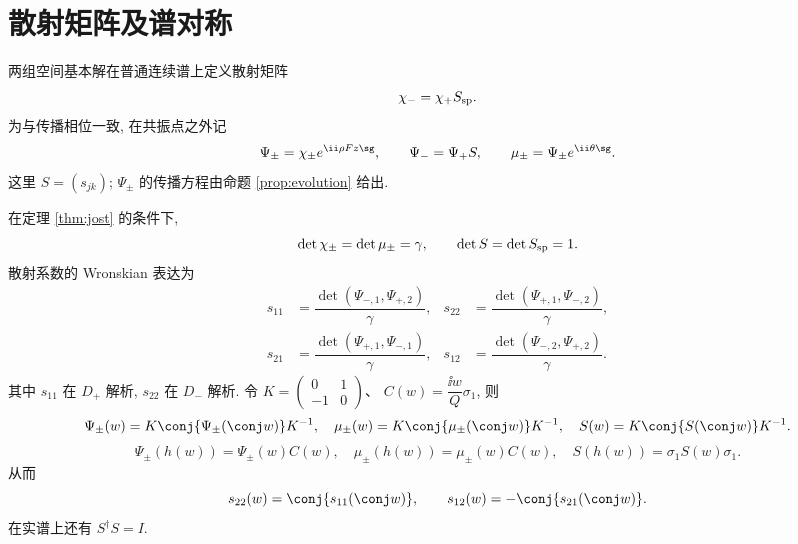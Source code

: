 \section{散射矩阵及谱对称}
两组空间基本解在普通连续谱上定义散射矩阵
\begin{equation}\label{eq:Sdef}
\chi_-=\chi_+S_{\rm sp}.
\end{equation}
为与传播相位一致, 在共振点之外记
\[
\Psi_\pm=\chi_\pm e^{\ii\rho Fz\sg},\qquad
\Psi_-=\Psi_+S,\qquad \mu_\pm=\Psi_\pm e^{\ii\theta\sg}.
\]
这里 $S=(s_{jk})$; $\Psi_\pm$ 的传播方程由命题 \ref{prop:evolution} 给出.

\begin{proposition}[散射系数与约化]\label{prop:scattering}
在定理 \ref{thm:jost} 的条件下,
\begin{equation}\label{eq:detjost}
\det\chi_\pm=\det\mu_\pm=\gamma,\qquad \det S=\det S_{\rm sp}=1.
\end{equation}
散射系数的 Wronskian 表达为
\begin{align}
s_{11}&=\dfrac{\det(\Psi_{-,1},\Psi_{+,2})}{\gamma},&
s_{22}&=\dfrac{\det(\Psi_{+,1},\Psi_{-,2})}{\gamma},\label{eq:wronskian}\\
s_{21}&=\dfrac{\det(\Psi_{+,1},\Psi_{-,1})}{\gamma},&
s_{12}&=\dfrac{\det(\Psi_{-,2},\Psi_{+,2})}{\gamma}.\nonumber
\end{align}
其中 $s_{11}$ 在 $D_+$ 解析, $s_{22}$ 在 $D_-$ 解析. 令
$K=\left(\begin{smallmatrix}0&1\\-1&0\end{smallmatrix}\right)$、
$C(w)=\dfrac{\ii w}{Q}\sigma_1$, 则
\begin{equation}\label{eq:conjugation}
\Psi_\pm(w)=K\conj{\Psi_\pm(\conj w)}K^{-1},\quad
\mu_\pm(w)=K\conj{\mu_\pm(\conj w)}K^{-1},\quad
S(w)=K\conj{S(\conj w)}K^{-1}.
\end{equation}
\begin{equation}\label{eq:musheet}
\Psi_\pm(h(w))=\Psi_\pm(w)C(w),\quad
\mu_\pm(h(w))=\mu_\pm(w)C(w),\quad
S(h(w))=\sigma_1S(w)\sigma_1.
\end{equation}
从而
\begin{equation}\label{eq:sconj}
s_{22}(w)=\conj{s_{11}(\conj w)},\qquad
s_{12}(w)=-\conj{s_{21}(\conj w)}.
\end{equation}
在实谱上还有 $S^\dagger S=I$.
\end{proposition}
